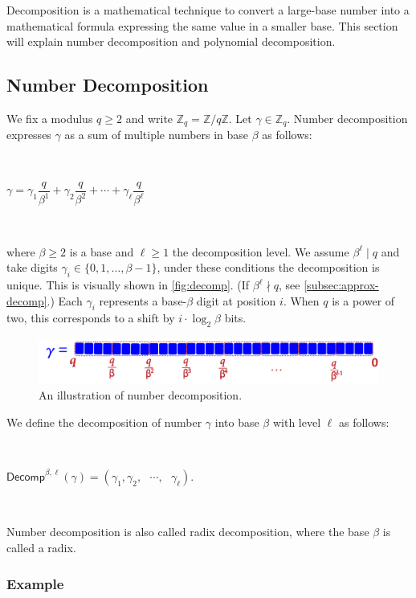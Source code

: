 Decomposition is a mathematical technique to convert a large-base number into a mathematical formula expressing the same value in a smaller base. This section will explain number decomposition and polynomial decomposition. 

\subsection{Number Decomposition}
\label{subsec:number-decomp}
We fix a modulus $q\ge 2$ and write $\mathbb{Z}_q=\mathbb{Z}/q\mathbb{Z}$. Let $\gamma\in\mathbb{Z}_q$. Number decomposition expresses $\gamma$ as a sum of multiple numbers in base $\beta$ as follows: 

$ $

$\gamma = \gamma_1 \dfrac{q}{\beta^1} + \gamma_2 \dfrac{q}{\beta^2} + \cdots + \gamma_\ell \dfrac{q}{\beta^\ell}  $

$ $

\noindent where $\beta\ge 2$ is a base and $\ell\ge 1$ the decomposition level. We assume $\beta^\ell \mid q$ and take digits $\gamma_i\in\{0,1,\ldots,\beta-1\}$, under these conditions the decomposition is unique. This is visually shown in \autoref{fig:decomp}. (If $\beta^\ell\nmid q$, see \autoref{subsec:approx-decomp}.) 
Each $\gamma_i$ represents a base-$\beta$ digit at position $i$. When $q$ is a power of two, this corresponds to a shift by $i\cdot \log_2\beta$ bits.

\begin{figure}[h!]
    \centering
  \includegraphics[width=0.8\linewidth]{figures/decomp.pdf}
  \caption{An illustration of number decomposition.}
  \label{fig:decomp}
\end{figure}

We define the decomposition of number $\gamma$ into base $\beta$ with level $\ell$ as follows:


$ $

$\textsf{Decomp}^{\beta, \ell}(\gamma) = (\gamma_1, \gamma_2, \text{ } \cdots , \text{ } \gamma_\ell)$.
 
$ $

Number decomposition is also called radix decomposition, where the base $\beta$ is called a radix. 


\subsubsection{Example}

